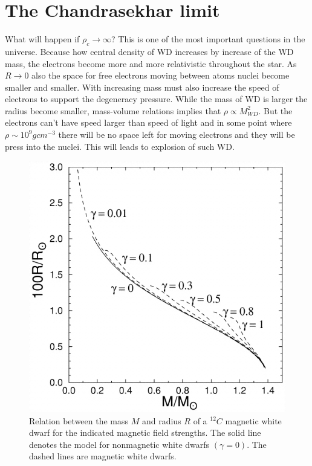 \documentclass[oneside,a4paper,11pt]{report}
\begin{document}
\section{The Chandrasekhar limit}
What will happen if $\rho_c \rightarrow \infty$? This is one of the most important questions in the universe. 
Because how central density of WD increases by increase of the WD mass, the electrons become more and more 
relativistic throughout the star. As $R\rightarrow 0 $ also the space for free electrons moving between atoms nuclei become
smaller and smaller. With increasing mass must also increase the speed of electrons to support the degeneracy pressure.  
While the mass of WD is larger the radius become smaller, mass-volume relations implies that $\rho\propto M_{WD}^2$. 
But the electrons can't have speed larger than speed of light and in some point where $\rho \sim 10^9 g cm ^{-3}$ there 
will be no space left for moving electrons and they will be press into the nuclei. This will leads to explosion of such WD. 

\begin{figure}[hbt!]
\centering
\includegraphics[totalheight=8cm]{plot/chlimit}
\caption{Relation between the mass $M$ and radius $R$ of a $^{12}C$ magnetic white dwarf for the indicated magnetic field strengths. 
The solid line denotes the \citet{1961ApJ...134..683H} model for nonmagnetic white dwarfs $(\gamma = 0)$. The dashed lines are magnetic 
white dwarfs. \citet{2000ApJ...530..949S} }
\label{Chlimit1} 
\end{figure}
\end{document}
